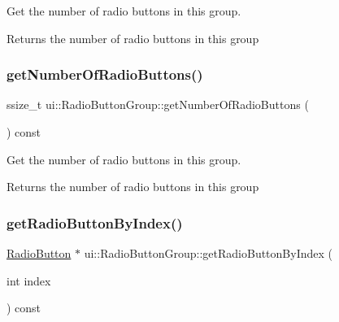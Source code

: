 Get the number of radio buttons in this group.

\begin{DoxyReturn}{Returns}
the number of radio buttons in this group 
\end{DoxyReturn}
\mbox{\label{classui_1_1RadioButtonGroup_a673d0fac47fbe688d10ffa361d8ae980}} 
\subsubsection{\texorpdfstring{get\+Number\+Of\+Radio\+Buttons()}{getNumberOfRadioButtons()}\hspace{0.1cm}{\footnotesize\ttfamily [2/2]}}
{\footnotesize\ttfamily ssize\+\_\+t ui\+::\+Radio\+Button\+Group\+::get\+Number\+Of\+Radio\+Buttons (\begin{DoxyParamCaption}{ }\end{DoxyParamCaption}) const}

Get the number of radio buttons in this group.

\begin{DoxyReturn}{Returns}
the number of radio buttons in this group 
\end{DoxyReturn}
\mbox{\label{classui_1_1RadioButtonGroup_aecf59594acbf123c6ca8d21ef631f9ce}} 
\subsubsection{\texorpdfstring{get\+Radio\+Button\+By\+Index()}{getRadioButtonByIndex()}\hspace{0.1cm}{\footnotesize\ttfamily [1/2]}}
{\footnotesize\ttfamily \hyperlink{classui_1_1RadioButton}{Radio\+Button} $\ast$ ui\+::\+Radio\+Button\+Group\+::get\+Radio\+Button\+By\+Index (\begin{DoxyParamCaption}\item[{int}]{index }\end{DoxyParamCaption}) const}

